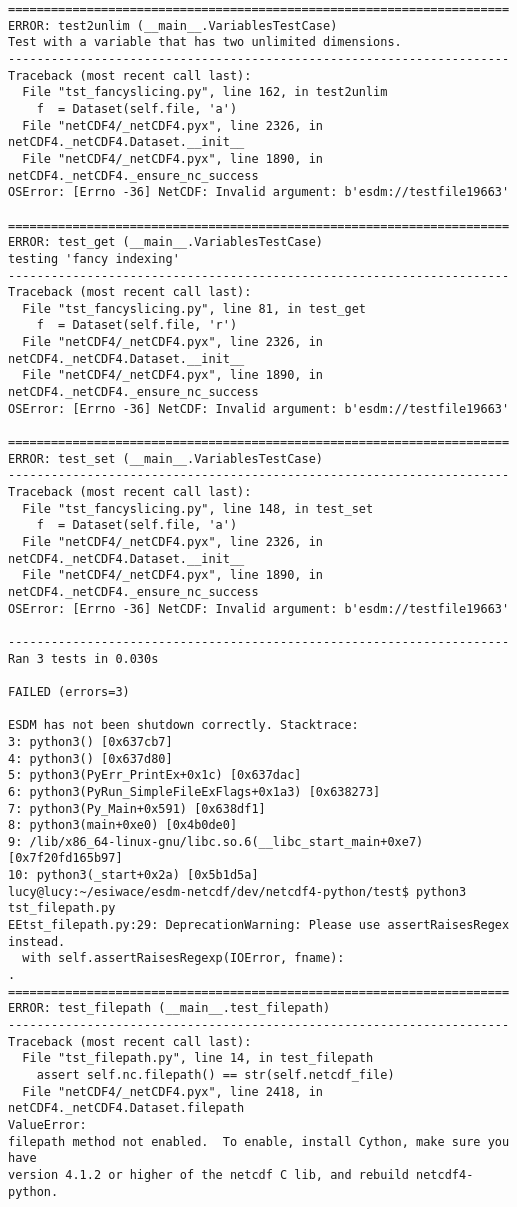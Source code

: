 \begin{verbatim}
======================================================================
ERROR: test2unlim (__main__.VariablesTestCase)
Test with a variable that has two unlimited dimensions.
----------------------------------------------------------------------
Traceback (most recent call last):
  File "tst_fancyslicing.py", line 162, in test2unlim
    f  = Dataset(self.file, 'a')
  File "netCDF4/_netCDF4.pyx", line 2326, in netCDF4._netCDF4.Dataset.__init__
  File "netCDF4/_netCDF4.pyx", line 1890, in netCDF4._netCDF4._ensure_nc_success
OSError: [Errno -36] NetCDF: Invalid argument: b'esdm://testfile19663'

======================================================================
ERROR: test_get (__main__.VariablesTestCase)
testing 'fancy indexing'
----------------------------------------------------------------------
Traceback (most recent call last):
  File "tst_fancyslicing.py", line 81, in test_get
    f  = Dataset(self.file, 'r')
  File "netCDF4/_netCDF4.pyx", line 2326, in netCDF4._netCDF4.Dataset.__init__
  File "netCDF4/_netCDF4.pyx", line 1890, in netCDF4._netCDF4._ensure_nc_success
OSError: [Errno -36] NetCDF: Invalid argument: b'esdm://testfile19663'

======================================================================
ERROR: test_set (__main__.VariablesTestCase)
----------------------------------------------------------------------
Traceback (most recent call last):
  File "tst_fancyslicing.py", line 148, in test_set
    f  = Dataset(self.file, 'a')
  File "netCDF4/_netCDF4.pyx", line 2326, in netCDF4._netCDF4.Dataset.__init__
  File "netCDF4/_netCDF4.pyx", line 1890, in netCDF4._netCDF4._ensure_nc_success
OSError: [Errno -36] NetCDF: Invalid argument: b'esdm://testfile19663'

----------------------------------------------------------------------
Ran 3 tests in 0.030s

FAILED (errors=3)

ESDM has not been shutdown correctly. Stacktrace:
3: python3() [0x637cb7]
4: python3() [0x637d80]
5: python3(PyErr_PrintEx+0x1c) [0x637dac]
6: python3(PyRun_SimpleFileExFlags+0x1a3) [0x638273]
7: python3(Py_Main+0x591) [0x638df1]
8: python3(main+0xe0) [0x4b0de0]
9: /lib/x86_64-linux-gnu/libc.so.6(__libc_start_main+0xe7) [0x7f20fd165b97]
10: python3(_start+0x2a) [0x5b1d5a]
lucy@lucy:~/esiwace/esdm-netcdf/dev/netcdf4-python/test$ python3 tst_filepath.py
EEtst_filepath.py:29: DeprecationWarning: Please use assertRaisesRegex instead.
  with self.assertRaisesRegexp(IOError, fname):
.
======================================================================
ERROR: test_filepath (__main__.test_filepath)
----------------------------------------------------------------------
Traceback (most recent call last):
  File "tst_filepath.py", line 14, in test_filepath
    assert self.nc.filepath() == str(self.netcdf_file)
  File "netCDF4/_netCDF4.pyx", line 2418, in netCDF4._netCDF4.Dataset.filepath
ValueError:
filepath method not enabled.  To enable, install Cython, make sure you have
version 4.1.2 or higher of the netcdf C lib, and rebuild netcdf4-python.


\end{verbatim}
